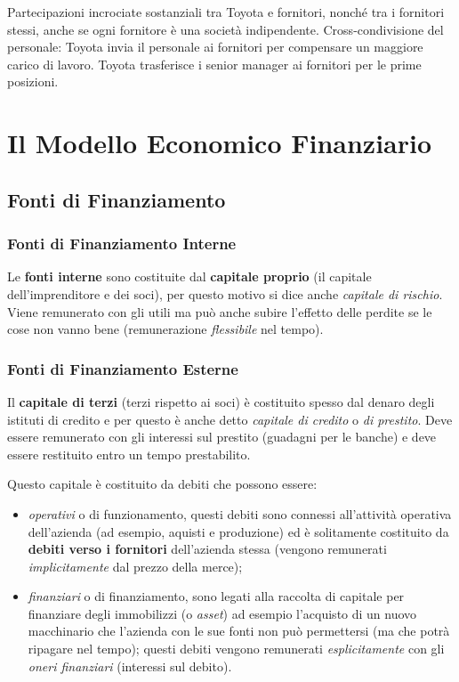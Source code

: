 \documentclass[a4paper,portrait,12pt]{article}
\theoremstyle{definition}
\begin{document}
Partecipazioni incrociate sostanziali tra Toyota e fornitori, nonché tra i fornitori stessi, anche se ogni fornitore è una società indipendente.
Cross-condivisione del personale: Toyota invia il personale ai fornitori per compensare un maggiore carico di lavoro.
Toyota trasferisce i senior manager ai fornitori per le prime posizioni.



\newpage
\section{Il Modello Economico Finanziario}



\subsection{Fonti di Finanziamento}

\subsubsection{Fonti di Finanziamento Interne}
Le \textbf{fonti interne} sono costituite dal \textbf{capitale proprio} (il capitale dell'imprenditore e dei soci), per questo motivo si dice anche \emph{capitale di rischio}.
Viene remunerato con gli utili ma può anche subire l'effetto delle perdite se le cose non vanno bene (remunerazione \emph{flessibile} nel tempo).

\subsubsection{Fonti di Finanziamento Esterne}
Il \textbf{capitale di terzi} (terzi rispetto ai soci) è costituito spesso dal denaro degli istituti di credito e per questo è anche detto \emph{capitale di credito} o \emph{di prestito}.
Deve essere remunerato con gli interessi sul prestito (guadagni per le banche) e deve essere restituito entro un tempo prestabilito.

Questo capitale è costituito da debiti che possono essere:
\begin{itemize}
\item \emph{operativi} o di funzionamento, questi debiti sono connessi all'attività operativa dell'azienda (ad esempio, aquisti e produzione) ed è solitamente costituito da \textbf{debiti verso i fornitori} dell'azienda stessa (vengono remunerati \emph{implicitamente} dal prezzo della merce);
\item \emph{finanziari} o di finanziamento, sono legati alla raccolta di capitale per finanziare degli immobilizzi (o \emph{asset}) ad esempio l'acquisto di un nuovo macchinario che l'azienda con le sue fonti non può permettersi (ma che potrà ripagare nel tempo); questi debiti vengono remunerati \emph{esplicitamente} con gli \emph{oneri finanziari} (interessi sul debito).
\end{itemize} 
\end{document}
